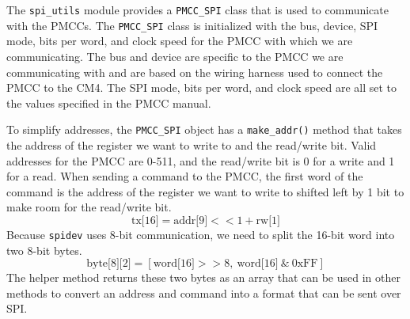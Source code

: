 The \texttt{spi\_utils} module provides a \texttt{PMCC\_SPI} class that is used to communicate with the PMCCs.
The \texttt{PMCC\_SPI} class is initialized with the bus, device, SPI mode, bits per word, and clock speed for the PMCC with which we are communicating.
The bus and device are specific to the PMCC we are communicating with and are based on the wiring harness used to connect the PMCC to the CM4.
The SPI mode, bits per word, and clock speed are all set to the values specified in the PMCC manual.

To simplify addresses, the \texttt{PMCC\_SPI} object has a \texttt{make\_addr()} method that takes the address of the register we want to write to and the read/write bit.
Valid addresses for the PMCC are 0-511, and the read/write bit is 0 for a write and 1 for a read.
When sending a command to the PMCC, the first word of the command is the address of the register we want to write to shifted left by 1 bit to make room for the read/write bit.
\begin{equation}
    \text{tx[16]} = \text{addr[9]} << 1 + \text{rw[1]}
\end{equation}
Because \texttt{spidev} uses 8-bit communication, we need to split the 16-bit word into two 8-bit bytes.
\begin{equation}
    \label{readout/eq:split_word}
    \text{byte[8][2]} = [\text{word[16]} >> 8,\ \text{word[16]}\ \text{\&}\ \text{0xFF}]
\end{equation}
The helper method returns these two bytes as an array that can be used in other methods to convert an address and command into a format that can be sent over SPI.

